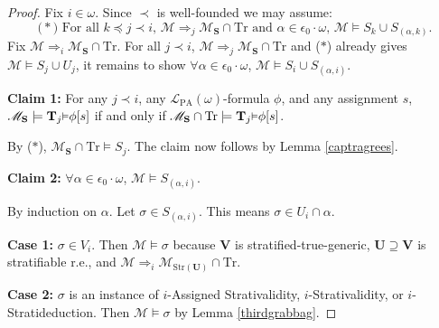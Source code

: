 \documentclass[reqno]{article}
\theoremstyle{definition}
\def\L{\mathscr{L}}
\def\M{\mathscr{M}}
\def\T{\mathbf{T}}
\def\S{\mathbf{S}}
\def\U{\mathbf{U}}
\def\V{\mathbf{V}}
\def\LPA{\L_{\mathrm{PA}}}
\def\epom{\epsilon_0\cdot\omega}
\def\Tr{\mathrm{Tr}}
\def\ctr{\cap\Tr}
\def\myequiv{\Rightarrow}
\renewcommand{\Pr}[1]{\T_{#1}\mbox{\small${\vDash}$}}
\newcommand{\case}[1]{\textbf{Case #1:}}
\newcommand{\claim}[1]{\textbf{Claim #1:}}
\newcommand{\str}[1]{\mathrm{Str}(#1)} \newcommand{\Str}[1]{\str{#1}}
\begin{document}
\begin{proof}
Fix $i\in\omega$.  Since $\prec$ is well-founded we may assume:
\[
\mbox{($*$) For all $k\preceq j\prec i$, $\M\myequiv_j\M_\S\ctr$ and $\alpha\in\epom$, $\M\models S_k\cup S_{(\alpha,k)}$.}
\]
Fix $\M\myequiv_i\M_\S\ctr$.  For all $j\prec i$, $\M\myequiv_j\M_\S\ctr$ and ($*$) already gives $\M\models S_j\cup U_j$,
it remains to show $\forall \alpha\in\epom$, $\M\models S_i\cup S_{(\alpha,i)}$.

\item
\claim1
For any $j\prec i$, any $\LPA(\omega)$-formula $\phi$, and any assignment $s$,
$\M_\S\models\Pr j\phi[s]$ if and only if $\M_\S\ctr\models\Pr j\phi[s]$.

\item
By ($*$), $\M_\S\ctr\models S_j$.
The claim now follows by Lemma \ref{captragrees}.

\item
\claim2
$\forall \alpha\in\epom$, $\M\models S_{(\alpha,i)}$.

\item
By induction on $\alpha$.  Let $\sigma\in S_{(\alpha,i)}$.  This means $\sigma\in U_i\cap\alpha$.

\item\case1
$\sigma\in V_i$.  Then $\M\models \sigma$ because $\V$ is stratified-true-generic, $\U\supseteq\V$
is stratifiable r.e., and $\M\myequiv_i\M_{\str\U}\ctr$.

\item\case2
$\sigma$ is an instance of $i$-Assigned Strativalidity, $i$-Strativalidity, or $i$-Stratideduction.
Then $\M\models\sigma$ by Lemma \ref{thirdgrabbag}.


\end{proof}
\end{document}
